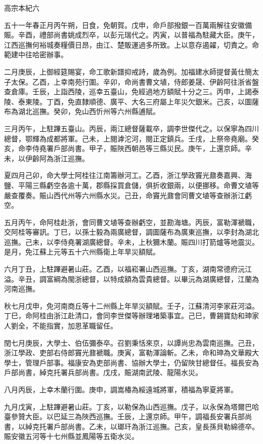 
\begin{pinyinscope}
高宗本紀六

五十一年春正月丙午朔，日食，免朝賀。戊申，命戶部撥銀一百萬兩解往安徽備賑。辛酉，禮部尚書姚成烈卒，以彭元瑞代之。丙寅，以普福為駐藏大臣。庚午，江西巡撫何裕城奏糧價日昂，由江、楚販運過多所致。上以意存遏糴，切責之。命範建中往哈密辦事。

二月庚辰，上御經筵賜宴，命工歌新譜抑戒詩，歲為例。加福建水師提督黃仕簡太子太保。乙酉，上幸南苑行圍。辛卯，命尚書曹文埴，侍郎姜晟、伊齡阿往浙省盤查倉庫。壬辰，上詣西陵，巡幸五臺山，免經過地方額賦十分之三。丙申，上謁泰陵、泰東陵。丁酉，免直隸順德、廣平、大名三府屬上年災欠銀米。己亥，以圖薩布為湖北巡撫。癸卯，免山西忻州等六州縣逋賦。

三月丙午，上駐蹕五臺山。丙辰，兩江總督薩載卒，調李世傑代之。以保寧為四川總督，鄂輝為成都將軍。己未，上閱滹沱河，閱正定鎮兵。壬戌，上祭帝堯廟。癸亥，命李侍堯署戶部尚書。甲子，賑陜西朝邑等三縣災民。庚午，上還京師。辛未，以伊齡阿為浙江巡撫。

夏四月己卯，命大學士阿桂往江南籌辦河工。乙酉，浙江學政竇光鼐奏嘉興、海鹽、平陽三縣虧空各逾十萬，郡縣採買倉儲，俱折收銀兩，以便挪移。命曹文埴等嚴查覆奏。賑山西代州等六州縣水災。己丑，命竇光鼐會同曹文埴等查辦浙江虧空。

五月丙午，命阿桂赴浙，會同曹文埴等查辦虧空，並勘海塘。丙辰，富勒渾褫職，交阿桂等審訊。丁巳，以孫士毅為兩廣總督，調圖薩布為廣東巡撫，以李封為湖北巡撫。己未，以李侍堯署湖廣總督。辛未，上秋獮木蘭。賑四川打箭爐等地震災。是月，免江蘇上元等五十六州縣衛上年旱災額賦。

六月丁丑，上駐蹕避暑山莊。乙酉，以福崧署山西巡撫。丁亥，湖南常德府沅江溢。辛丑，調富綱為閩浙總督，以特成額為雲貴總督。以畢沅為湖廣總督，江蘭為河南巡撫。

秋七月戊申，免河南商丘等十二州縣上年旱災額賦。壬子，江蘇清河李家莊河溢。丁巳，命阿桂由浙江赴清口，會同李世傑等辦理堵築事宜。己巳，曹錫寶劾和珅家人劉全，不能指實，加恩革職留任。

閏七月庚辰，大學士、伯伍彌泰卒。召劉秉恬來京，以譚尚忠為雲南巡撫。己丑，浙江學政、吏部右侍郎竇光鼐褫職。庚寅，富勒渾論斬。乙未，命和珅為文華殿大學士，管理戶部事。福康安為吏部尚書、協辦大學士，仍留陜甘總督任。福長安為戶部尚書，綽克托署兵部尚書。戊戌，賑湖南武陵、龍陽水災。

八月丙辰，上幸木蘭行圍。庚申，調嵩椿為綏遠城將軍，積福為寧夏將軍。

九月戊寅，上駐蹕避暑山莊。丁亥，以勒保為山西巡撫。戊子，以永保為塔爾巴哈臺參贊大臣。以巴延三為陜西巡撫。壬辰，上還京師。甲午，調福長安署兵部尚書，以綽克托署戶部尚書。乙未，以瑯玕為浙江巡撫。己亥，皇長孫貝勒綿德卒。賑安徽五河等十七州縣並鳳陽等五衛水災。


\end{pinyinscope}
